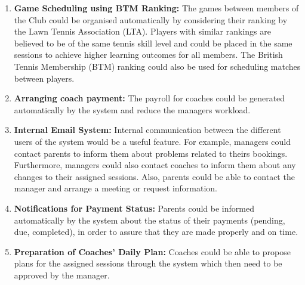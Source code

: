 \documentclass{l3proj}
\begin{document}
\begin{enumerate}
	\item \textbf{Game Scheduling using BTM Ranking:} The games between members of the Club could be organised automatically by considering their ranking by the Lawn Tennis Association (LTA). Players with similar rankings are believed to be of the same tennis skill level and could be placed in the same sessions to achieve higher learning outcomes for all members. The British Tennis Membership (BTM) ranking could also be used for scheduling matches between players.
	\item \textbf{Arranging coach payment:} The payroll for coaches could be generated automatically by the system and reduce the managers workload.
	\item \textbf{Internal Email System:} Internal communication between the different users of the system would be a useful feature. For example, managers could contact parents to inform them about problems related to theirs bookings. Furthermore, managers could also contact coaches to inform them about any changes to their assigned sessions. Also, parents could be able to contact the manager and arrange a meeting or request information.
	\item \textbf{Notifications for Payment Status:} Parents could be informed automatically by the system about the status of their payments (pending, due, completed), in order to assure that they are made properly and on time.
	\item \textbf{Preparation of Coaches'  Daily Plan:} Coaches could be able to propose plans for the assigned sessions through the system which then need to be approved by the manager.

\end{enumerate}


\end{document}
